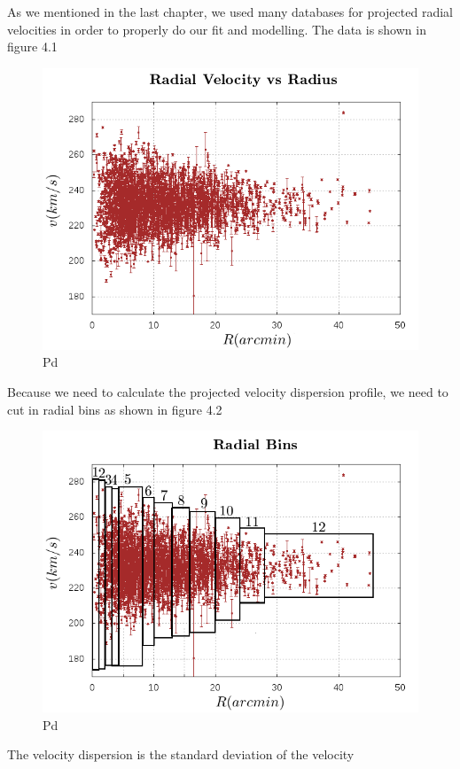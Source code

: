 As we mentioned in the last chapter, we used many databases for projected radial velocities in order to properly do our fit and modelling. The data is shown in figure 4.1

\begin{figure}[H]
\centering
\includegraphics[width=12cm]{images/vel_vs_rad.png}
\caption[Pg]{Pd}
\end{figure}

Because we need to calculate the projected velocity dispersion profile, we need to cut in radial bins as shown in figure 4.2 

\begin{figure}[H]
\centering
\includegraphics[width=12cm]{images/vel_vs_rad_bins.png}
\caption[Pg]{Pd}
\end{figure}

The velocity dispersion is the standard deviation of the velocity

